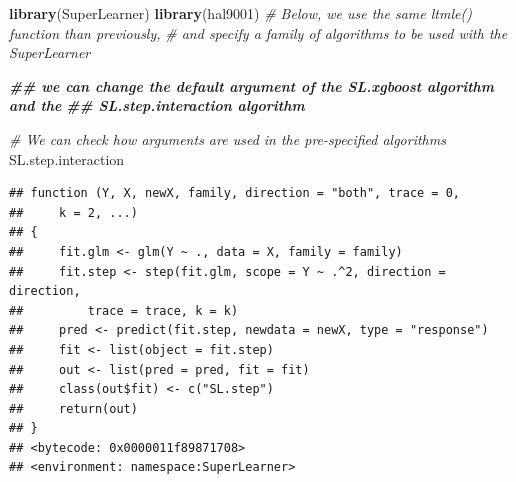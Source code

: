 \documentclass[
]{book}
\newenvironment{Shaded}{\begin{snugshade}}{\end{snugshade}}
\newcommand{\AttributeTok}[1]{\textcolor[rgb]{0.13,0.29,0.53}{#1}}
\newcommand{\CommentTok}[1]{\textcolor[rgb]{0.56,0.35,0.01}{\textit{#1}}}
\newcommand{\ControlFlowTok}[1]{\textcolor[rgb]{0.13,0.29,0.53}{\textbf{#1}}}
\newcommand{\DocumentationTok}[1]{\textcolor[rgb]{0.56,0.35,0.01}{\textbf{\textit{#1}}}}
\newcommand{\FunctionTok}[1]{\textcolor[rgb]{0.13,0.29,0.53}{\textbf{#1}}}
\newcommand{\NormalTok}[1]{#1}
\newcommand{\OtherTok}[1]{\textcolor[rgb]{0.56,0.35,0.01}{#1}}
\newcommand{\StringTok}[1]{\textcolor[rgb]{0.31,0.60,0.02}{#1}}
\begin{document}
\begin{Shaded}
\begin{Highlighting}[]
\FunctionTok{library}\NormalTok{(SuperLearner)}
\FunctionTok{library}\NormalTok{(hal9001)}
\CommentTok{\# Below, we use the same ltmle() function than previously, }
\CommentTok{\# and specify a family of algorithms to be used with the SuperLearner}

\DocumentationTok{\#\# we can change the default argument of the SL.xgboost algorithm and the }
\DocumentationTok{\#\# SL.step.interaction algorithm}

\CommentTok{\# We can check how arguments are used in the pre{-}specified algorithms}
\NormalTok{SL.step.interaction}
\end{Highlighting}
\end{Shaded}

\begin{verbatim}
## function (Y, X, newX, family, direction = "both", trace = 0, 
##     k = 2, ...) 
## {
##     fit.glm <- glm(Y ~ ., data = X, family = family)
##     fit.step <- step(fit.glm, scope = Y ~ .^2, direction = direction, 
##         trace = trace, k = k)
##     pred <- predict(fit.step, newdata = newX, type = "response")
##     fit <- list(object = fit.step)
##     out <- list(pred = pred, fit = fit)
##     class(out$fit) <- c("SL.step")
##     return(out)
## }
## <bytecode: 0x0000011f89871708>
## <environment: namespace:SuperLearner>
\end{verbatim}

\begin{Shaded}
\end{Shaded}
\end{document}
